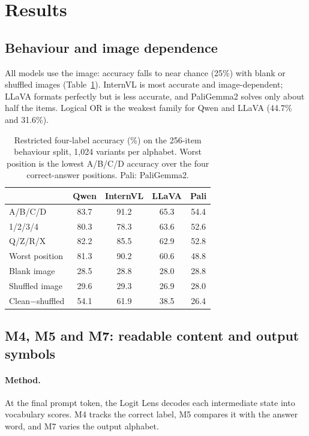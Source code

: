 \documentclass[11pt]{article}
\begin{document}
\section{Results}

\subsection{Behaviour and image dependence}

All models use the image: accuracy falls to near chance (25\%) with blank or shuffled images (Table~\ref{tab:behaviour}). InternVL is most accurate and image-dependent; LLaVA formats perfectly but is less accurate, and PaliGemma2 solves only about half the items. Logical OR is the weakest family for Qwen and LLaVA (44.7\% and 31.6\%).

\begin{table}[t]
\centering
\footnotesize
\setlength{\tabcolsep}{3pt}
\begin{tabularx}{\columnwidth}{@{}X*{4}{c}@{}}
\toprule
 & Qwen & InternVL & LLaVA & Pali \\
\midrule
A/B/C/D & 83.7 & 91.2 & 65.3 & 54.4 \\
1/2/3/4 & 80.3 & 78.3 & 63.6 & 52.6 \\
Q/Z/R/X & 82.2 & 85.5 & 62.9 & 52.8 \\
Worst position & 81.3 & 90.2 & 60.6 & 48.8 \\
Blank image & 28.5 & 28.8 & 28.0 & 28.8 \\
Shuffled image & 29.6 & 29.3 & 26.9 & 28.0 \\
Clean$-$shuffled & 54.1 & 61.9 & 38.5 & 26.4 \\
\bottomrule
\end{tabularx}
\caption{Restricted four-label accuracy (\%) on the 256-item behaviour split, 1,024 variants per alphabet. Worst position is the lowest A/B/C/D accuracy over the four correct-answer positions. Pali: PaliGemma2.}
\label{tab:behaviour}
\end{table}


\subsection{M4, M5 and M7: readable content and output symbols}

\paragraph{Method.} At the final prompt token, the Logit Lens decodes each intermediate state into vocabulary scores. M4 tracks the correct label, M5 compares it with the answer word, and M7 varies the output alphabet.
\end{document}
